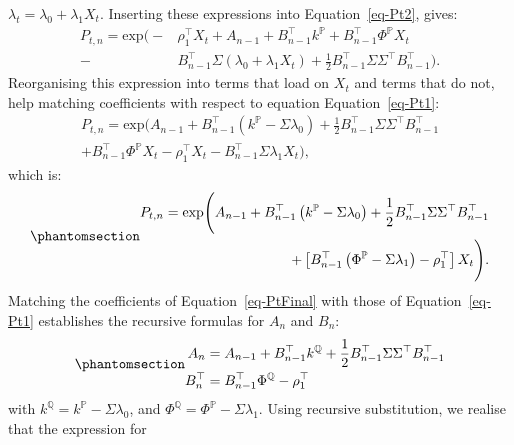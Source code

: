 \documentclass[
  letterpaper,
  DIV=11,
  numbers=noendperiod]{scrreprt}
\begin{document}
\(\lambda_t = \lambda_0 + \lambda_1 X_t\). Inserting these expressions
into Equation~\ref{eq-Pt2}, gives:
\begin{align}
    P_{t,n} = \text{exp} \Big( -&\rho^{\top}_1 X_t + A_{n-1} + B^{\top}_{n-1} k^\mathbb{P} +B^{\top}_{n-1} \Phi^\mathbb{P} X_{t} \nonumber \\
     - &B^{\top}_{n-1} \Sigma \left(\lambda_0 + \lambda_1 X_t \right) + \frac{1}{2} B^{\top}_{n-1} \Sigma \Sigma^{\top} B^{\top}_{n-1} \Big).
\end{align}
Reorganising this expression into terms that load on \(X_t\) and terms
that do not, help matching coefficients with respect to equation
Equation~\ref{eq-Pt1}:
\begin{align}
    P_{t,n} = \text{exp}\Big( A_{n-1} + B^{\top}_{n-1} \left( k^\mathbb{P} - \Sigma \lambda_0 \right) + \frac{1}{2} B^{\top}_{n-1} \Sigma \Sigma^{\top} B^{\top}_{n-1} \nonumber  \\ 
      +  B^{\top}_{n-1} \Phi^\mathbb{P} X_{t} -\rho^{\top}_1 X_t - B^{\top}_{n-1} \Sigma \lambda_1 X_t \Big),
\end{align}
which is: \begin{equation}\protect\phantomsection\label{eq-PtFinal}{
\begin{align}
    P_{t,n} = \text{exp}\Bigg( A_{n-1} + B^{\top}_{n-1} \left( k^\mathbb{P} - \Sigma \lambda_0 \right) + \frac{1}{2} B^{\top}_{n-1} \Sigma \Sigma^{\top} B^{\top}_{n-1} \nonumber  \\ 
      +  \left[ B^{\top}_{n-1} \left( \Phi^\mathbb{P}- \Sigma \lambda_1 \right) - \rho^{\top}_1 \right] X_t \Bigg).
\end{align}
}\end{equation} Matching the coefficients of Equation~\ref{eq-PtFinal}
with those of Equation~\ref{eq-Pt1} establishes the recursive formulas
for \(A_{n}\) and \(B_{n}\):
\begin{equation}\protect\phantomsection\label{eq-Bfin}{
\begin{align}
    A_n  &= A_{n-1} + B^{\top}_{n-1} k^\mathbb{Q} +\frac{1}{2} B^{\top}_{n-1} \Sigma \Sigma^{\top} B^{\top}_{n-1} \\
    B^{\top}_n &= B^{\top}_{n-1} \Phi^\mathbb{Q} - \rho^{\top}_1
\end{align}
}\end{equation} with \(k^\mathbb{Q} = k^\mathbb{P} - \Sigma \lambda_0\),
and \(\Phi^\mathbb{Q} =  \Phi^\mathbb{P}- \Sigma \lambda_1\). Using
recursive substitution, we realise that the expression for
\end{document}
